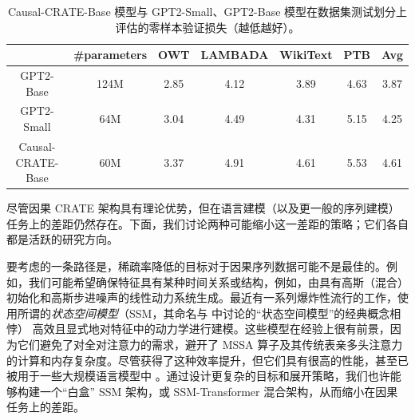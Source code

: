 \documentclass[../../book-main_zh.tex]{subfiles}
\begin{document}
\begin{table}[t!]
    \small
    \caption{\small Causal-CRATE-Base 模型与 GPT2-Small、GPT2-Base 模型在数据集测试划分上评估的零样本验证损失（越低越好）。
    }
    \centering
    \resizebox{1\columnwidth}{!}
    {
        \begin{tabular}{ccccccc}
            \hline
            & \#parameters & \textbf{OWT} & \textbf{LAMBADA} &
            \textbf{WikiText} & \textbf{PTB} & \textbf{Avg} \\
            \hline
            GPT2-Base  & {124M} & 2.85 & 4.12 & 3.89 & 4.63 & 3.87 \\
            {GPT2-Small } &  {64M} & {3.04} & {4.49} & {4.31} &
            {5.15} & {4.25} \\
            Causal-CRATE-Base & {60M} & 3.37 & 4.91 & 4.61 & 5.53 & 4.61 \\
            \hline
        \end{tabular}
    }
    \label{tab:causal-crate-results}
\end{table}

尽管因果 CRATE 架构具有理论优势，但在语言建模（以及更一般的序列建模）任务上的差距仍然存在。下面，我们讨论两种可能缩小这一差距的策略；它们各自都是活跃的研究方向。

\begin{example}[更好的目标和展开策略]
    要考虑的一条路径是，稀疏率降低的目标对于因果序列数据可能不是最佳的。例如，我们可能希望确保特征具有某种时间关系或结构，例如，由具有高斯（混合）初始化和高斯步进噪声的线性动力系统生成。最近有一系列爆炸性流行的工作，使用所谓的\textit{状态空间模型}（SSM，其命名与  中讨论的“状态空间模型”的经典概念相悖）\citep{gu2024mamba,yang2024parallelizing,yang2024gated} 高效且显式地对特征中的动力学进行建模。这些模型在经验上很有前景，因为它们避免了对全对注意力的需求，避开了 MSSA 算子及其传统表亲多头注意力的计算和内存复杂度。尽管获得了这种效率提升，但它们具有很高的性能，甚至已被用于一些大规模语言模型中 \citep{team2025kimi}。通过设计更复杂的目标和展开策略，我们也许能够构建一个“白盒” SSM 架构，或 SSM-Transformer 混合架构，从而缩小在因果任务上的差距。
\end{example}
\end{document}

